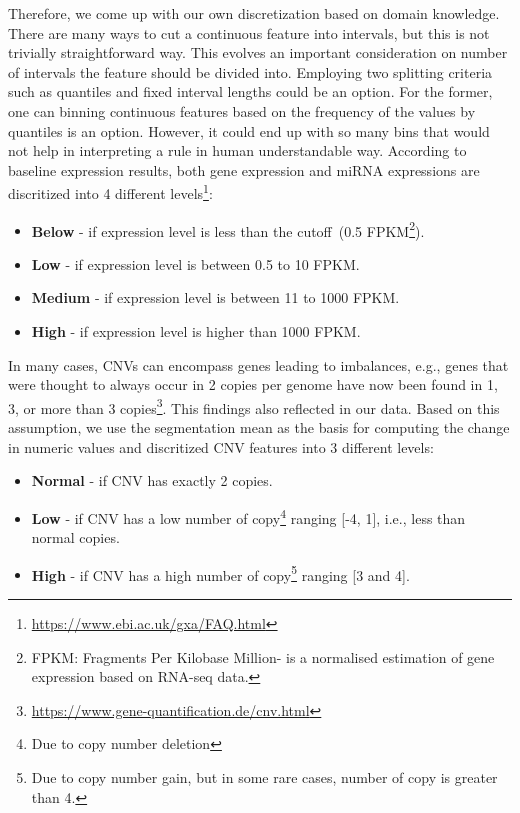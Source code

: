 \hspace*{3.5mm} Therefore, we come up with our own discretization based on domain knowledge. There are many ways to cut a continuous feature into intervals, but this is not trivially straightforward way. This evolves an important consideration on number of intervals the feature should be divided into. Employing two splitting criteria such as quantiles and fixed interval lengths could be an option. For the former, one can binning continuous features based on the frequency of the values by quantiles is an option. However, it could end up with so many bins that would not help in interpreting a rule in human understandable way. 
According to baseline expression results, both gene expression and miRNA expressions are discritized into 4 different levels\footnote{\url{https://www.ebi.ac.uk/gxa/FAQ.html}}:

\vspace{-2mm}
\begin{itemize}[noitemsep]
    \item \textbf{Below} - if expression level is less than the cutoff~(0.5 FPKM\footnote{FPKM: Fragments Per Kilobase Million- is a normalised estimation of gene expression based on RNA-seq data.}).
    \item \textbf{Low} - if expression level is between 0.5 to 10 FPKM.
    \item \textbf{Medium} - if expression level is between 11 to 1000 FPKM. 
    \item \textbf{High} - if expression level is higher than 1000 FPKM. 
\end{itemize}

\hspace*{3.5mm} In many cases, CNVs can encompass genes leading to imbalances, e.g., genes that were thought to always occur in 2 copies per genome have now been found in 1, 3, or more than 3  copies\footnote{\url{https://www.gene-quantification.de/cnv.html}}. This findings also reflected in our data. Based on this assumption, we use the segmentation mean as the basis for computing the change in numeric values and discritized CNV features into 3 different levels:  

\vspace{-2mm}
\begin{itemize}[noitemsep]
    \item \textbf{Normal} - if CNV has exactly 2 copies.
    \item\textbf{Low} - if CNV has a low number of copy\footnote{Due to copy number deletion} ranging [-4, 1], i.e., less than normal copies.
    \item\textbf{High} - if CNV has a high number of copy\footnote{Due to copy number gain, but in some rare cases, number of copy is greater than 4.} ranging [3 and 4].  %
\end{itemize}
\vspace{-2mm}

